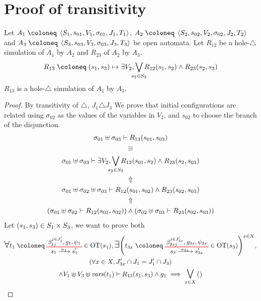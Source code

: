 \documentclass{article}
\begin{document}


\section{Proof of transitivity}\label{apx:trans}
Let \(A_1 \defobject \OAg[1]\), \(A_2 \defobject \OAg[2]\) and \(A_3 \defobject \OAg[3]\) be open automata.
Let \(R_{12}\) be a hole-\(\triangle\) simulation of \(A_1\) by \(A_2\) and \(R_{23}\) of \(A_2\) by \(A_3\).
\[ R_{13} \defobject \mpar{s_1, s_3} \mapsto \exists V_2, \bigvee_\subbox{s_2 \in S_2} R_{12}\mpar{s_1, s_2} \wedge R_{23}\mpar{s_2, s_3} \]
\(R_{13}\) is a hole-\(\triangle\) simulation of \(A_1\) by \(A_3\).
\begin{proof}
 By transitivity of \(\triangle\), \(J_1 \triangle J_3\)
 We prove that initial configurations are related using \(\sigma_{02}\) as the values of the variables in \(V_2\), and \(s_{02}\) to choose the branch of the disjunction.
\begin{gather*}
	\sigma_{01} \uplus \sigma_{03} \vdash R_{13}\mpar{s_{01}, s_{03}} \\
	\equiv \\
	\sigma_{01} \uplus \sigma_{03} \vdash \exists V_2, \bigvee_\subbox{s_2 \in S_2} R_{12}\mpar{s_{01}, s_2} \wedge R_{23}\mpar{s_2, s_{03}} \\
	\Uparrow \\
	\sigma_{01} \uplus \sigma_{02} \uplus \sigma_{03} \vdash R_{12}\mpar{s_{01}, s_{02}} \wedge R_{23}\mpar{s_{02}, s_{03}} \\
	\Uparrow \\
	\mpar{\sigma_{01} \uplus \sigma_{02} \vdash R_{12}\mpar{s_{01}, s_{02}}} \wedge \mpar{\sigma_{02} \uplus \sigma_{03} \vdash R_{23}\mpar{s_{02}, s_{03}}}
\end{gather*}
 Let \({\left(s_1, s_3\right)} \in S_1 \times S_3\), we want to prove both
	\begin{multline}
		\bigsymb{\forall} t_1 \defobject \OTx{1}{}{1}{1} \in \fOT{s_1}, \bigsymb{\exists} \mpar{t_{3x} \defobject \OTx{3}{x}{3x}{3x} \in \fOT{s_3}}^{x \in X}, \\
		\mpar{\forall x \in X, J'_{3x} \cap J_1 = J'_1 \cap J_3} \\
		\wedge V_1 \uplus V_3 \uplus \fvars{t_1} \vdash R_{13}\mpar{s_1, s_3} \wedge g_1 \implies \operatorname*{\bigsymb{\bigvee}}_{x \in X} \mpar{\everymath{\displaystyle}\begin{array}{l}

\end{array}}
\end{multline}
\end{proof}
\end{document}

